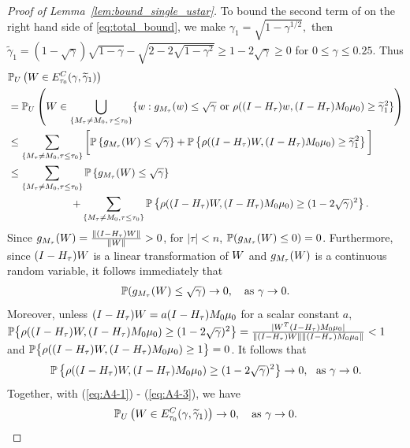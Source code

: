 \documentclass[10pt,a4paper]{amsart}
\def\P{\mathbb P}
\begin{document}
\begin{proof}[Proof of Lemma~\ref{lem:bound_single_ustar}]
To bound the second term of on the right hand side of \eqref{eq:total_bound}, we  make $\gamma_1= \sqrt{1- \gamma^{1/2}},$ then $\widetilde\gamma_1=(1-\sqrt{\gamma})\sqrt{1- \gamma} - \sqrt{2-2\sqrt{1-\gamma^2}} \geq 1 - 2\sqrt{\gamma} \geq 0$ for $0 \leq \gamma \leq 0.25.$ Thus 
\begin{align} \label{eq:A4-1} & \P_{\*U}\left(\*W \in E^C_{\tau_0}( \gamma, \widetilde \gamma_1)\right) \nonumber
 \\
 & = \P_{\*U}\left( \*W \in \bigcup_{\{\*M_\tau \neq \*M_0, \, \tau \leq \tau_0\}}\{\*w: g_{\*M_\tau}(\*w) \leq  \sqrt{\gamma} \mbox{ or }  \rho((\*I - \*H_\tau)\*w, (\*I - \*H_\tau)\*M_0\*\mu_0) \geq  \widetilde \gamma_1^2\}\right) \nonumber
 \\
  & \leq    \sum_{\{\*M_\tau \neq \*M_0, \tau \leq \tau_0\}}\bigg[\P\left\{g_{\*M_\tau}(\*W) \leq \sqrt{\gamma}\right\} +  \P\left\{\rho((\*I - \*H_\tau)\*W, (\*I - \*H_\tau)\*M_0\*\mu_0)\geq  \widetilde \gamma_1^2\right\}\bigg] \nonumber \\
   & \leq    \sum_{\{\*M_\tau \neq \*M_0, \tau \leq \tau_0\}}\P\left\{g_{\*M_\tau}(\*W) \leq \sqrt{\gamma}\right\} \nonumber \\ & \qquad\qquad\qquad + \sum_{\{\*M_\tau \neq \*M_0, \tau \leq \tau_0\}} \P\left\{\rho((\*I - \*H_\tau)\*W, (\*I - \*H_\tau)\*M_0\*\mu_0)\geq  (1 - 2\sqrt{\gamma})^2\right\}. 
\end{align}
Since $g_{\*M_\tau}(\*W)  = \frac{\|(\*I - \*H_\tau)\*W\|}{\|\*W\|} >0$, for $|\tau| < n$,  $\P(g_{\*M_\tau}(\*W)  \leq 0) = 0$.  Furthermore, since $(\*I - \*H_\tau)\*W$ is a linear transformation of $\*W$ and $g_{\*M_\tau}(\*W)$ is a continuous random variable, it follows immediately that 
\begin{align} \label{eq:A4-2}
\P(g_{\*M_\tau}(\*W)  \leq \sqrt{\gamma}) \rightarrow 0, 
\hbox{ \,\, as $\gamma \rightarrow 0.$}  
\end{align}
Moreover, unless $(\*I-\*H_\tau)\*W = a (\*I - \*H_\tau)\*M_0\*\mu_0$ for a scalar constant $a,$
$\P\big\{\rho((\*I - \*H_\tau)\*W, (\*I - \*H_\tau)\*M_0\*\mu_0)\geq  (1 - 2\sqrt{\gamma})^2\big\} = \frac{|\*W^T(\*I - \*H_\tau) \*M_0\*\mu_0|}{\|(I - H_\tau)\*W\|\|(\*I - \*H_\tau) \*M_0\*\mu_0\|} < 1$
and $\P\big\{\rho((\*I - \*H_\tau)\*W, (\*I - \*H_\tau)\*M_0\*\mu_0)\geq  1\big\} = 0$. 
It follows that  
\begin{align} \label{eq:A4-3}
\P\left\{\rho((\*I - \*H_\tau)\*W, (\*I - \*H_\tau)\*M_0\*\mu_0)\geq  (1 - 2\sqrt{\gamma})^2\right\} \rightarrow 0, \hbox{\,\, as $\gamma \rightarrow 0.$}   
\end{align}
Together, with (\ref{eq:A4-1}) - (\ref{eq:A4-3}), we have $$\P_{\*U}\left(\*W \in E^C_{\tau_0}( \gamma, \widetilde \gamma_1)\right) \rightarrow 0, \quad \hbox{as $\gamma \rightarrow 0.$} $$


\end{proof}
\end{document}
